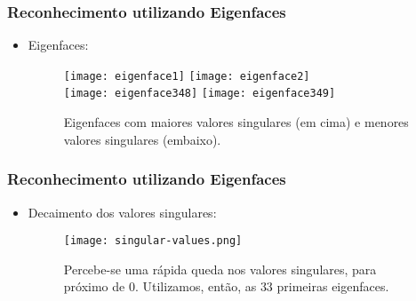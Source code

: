 \documentclass[15pt]{beamer}
\begin{document}
\begin{frame}
    \frametitle{Reconhecimento utilizando Eigenfaces}

    \begin{itemize}
        \item Eigenfaces:
            \begin{center}
                \begin{figure}
                    \texttt{[image: eigenface1]}
                    \texttt{[image: eigenface2]}
                    \\[\smallskipamount]
                    \texttt{[image: eigenface348]}
                    \texttt{[image: eigenface349]}
                    \caption{Eigenfaces com maiores valores singulares (em cima) e menores valores singulares (embaixo).}
                \end{figure}
            \end{center}
    \end{itemize}
\end{frame}

\begin{frame}
    \frametitle{Reconhecimento utilizando Eigenfaces}

    \begin{itemize}
        \item Decaimento dos valores singulares:
            \begin{figure}
                \begin{center}
                    \texttt{[image: singular-values.png]}
                    \caption{Percebe-se uma rápida queda nos valores singulares, para próximo de \( 0 \).
                    Utilizamos, então, as \( 33 \) primeiras eigenfaces.}
                \end{center}
            \end{figure}
    \end{itemize}

\end{frame} 
\end{document}
